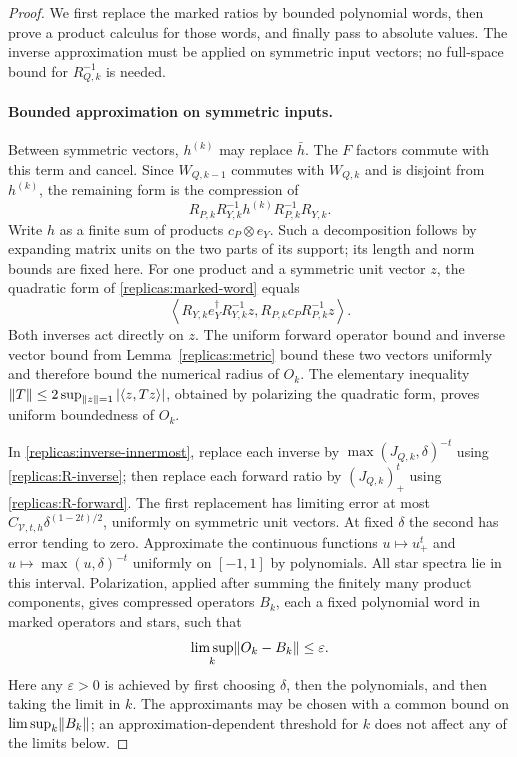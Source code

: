 \begin{proof}
We first replace the marked ratios by bounded polynomial words, then
prove a product calculus for those words, and finally pass to absolute
values.  The inverse approximation must be applied on symmetric
input vectors; no full-space bound for $R_{Q,k}^{-1}$ is needed.

\paragraph{Bounded approximation on symmetric inputs.}
Between symmetric vectors, $h^{(k)}$ may replace $\bar h$.
The $F$ factors commute with this term and cancel.  Since
$W_{Q,k-1}$ commutes with $W_{Q,k}$ and is disjoint from $h^{(k)}$,
the remaining form is the compression of
\begin{equation}\label{replicas:marked-word}
 R_{P,k}R_{Y,k}^{-1}h^{(k)}R_{P,k}^{-1}R_{Y,k}.
\end{equation}
Write $h$ as a finite sum of products $c_P\otimes e_Y$.
Such a decomposition follows by expanding matrix units on the two
parts of its support; its length and norm bounds are fixed here.
For one product and a symmetric unit vector $z$, the quadratic form
of \eqref{replicas:marked-word} equals
\begin{equation}\label{replicas:inverse-innermost}
 \left\langle R_{Y,k}e_Y^\dagger R_{Y,k}^{-1}z,
                  R_{P,k}c_P R_{P,k}^{-1}z\right\rangle.
\end{equation}
Both inverses act directly on $z$.  The uniform forward operator bound
and inverse vector bound from Lemma~\ref{replicas:metric} bound these
two vectors uniformly and therefore bound the numerical radius of
$O_k$.  The elementary inequality
$\lVert T\rVert\le2\sup_{\lVert z\rVert=1}|\langle z,Tz\rangle|$, obtained by
polarizing the quadratic form, proves uniform boundedness of $O_k$.

In \eqref{replicas:inverse-innermost}, replace each inverse by
$\max(J_{Q,k},\delta)^{-t}$ using
\eqref{replicas:R-inverse}; then replace each forward ratio by
$(J_{Q,k})_+^t$ using \eqref{replicas:R-forward}.
The first replacement has limiting error at most
$C_{\mathcal V,t,h}\delta^{(1-2t)/2}$, uniformly on symmetric unit
vectors.  At fixed $\delta$ the second has error tending to zero.
Approximate the continuous functions $u\mapsto u_+^t$ and
$u\mapsto\max(u,\delta)^{-t}$ uniformly on $[-1,1]$ by polynomials.
All star spectra lie in this interval.  Polarization, applied after
summing the finitely many product components, gives compressed
operators $B_k$, each a fixed polynomial word in marked operators
and stars, such that
\begin{equation}\label{replicas:polynomial-approximation}
 \limsup_k\lVert O_k-B_k\rVert\le\varepsilon.
\end{equation}
Here any $\varepsilon>0$ is achieved by first choosing $\delta$,
then the polynomials, and then taking the limit in $k$.
The approximants may be chosen with a common bound on
$\limsup_k\lVert B_k\rVert$; an approximation-dependent threshold for $k$
does not affect any of the limits below.


\end{proof}
